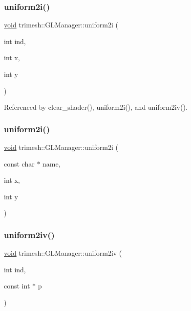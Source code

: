 \subsubsection{\texorpdfstring{uniform2i()}{uniform2i()}\hspace{0.1cm}{\footnotesize\ttfamily [1/2]}}
{\footnotesize\ttfamily \hyperlink{namespacetrimesh_a784ddfd979e1c579bda795a8edfc3f43}{void} trimesh\+::\+G\+L\+Manager\+::uniform2i (\begin{DoxyParamCaption}\item[{int}]{ind,  }\item[{int}]{x,  }\item[{int}]{y }\end{DoxyParamCaption})}



Referenced by clear\+\_\+shader(), uniform2i(), and uniform2iv().

\mbox{\label{classtrimesh_1_1GLManager_a97f27c4bcea42e9ebaef24cf558f91a3}} 
\subsubsection{\texorpdfstring{uniform2i()}{uniform2i()}\hspace{0.1cm}{\footnotesize\ttfamily [2/2]}}
{\footnotesize\ttfamily \hyperlink{namespacetrimesh_a784ddfd979e1c579bda795a8edfc3f43}{void} trimesh\+::\+G\+L\+Manager\+::uniform2i (\begin{DoxyParamCaption}\item[{const char $\ast$}]{name,  }\item[{int}]{x,  }\item[{int}]{y }\end{DoxyParamCaption})\hspace{0.3cm}{\ttfamily [inline]}}

\mbox{\label{classtrimesh_1_1GLManager_aca516770647d91fbb8637878e1ca1a66}} 
\subsubsection{\texorpdfstring{uniform2iv()}{uniform2iv()}\hspace{0.1cm}{\footnotesize\ttfamily [1/2]}}
{\footnotesize\ttfamily \hyperlink{namespacetrimesh_a784ddfd979e1c579bda795a8edfc3f43}{void} trimesh\+::\+G\+L\+Manager\+::uniform2iv (\begin{DoxyParamCaption}\item[{int}]{ind,  }\item[{const int $\ast$}]{p }\end{DoxyParamCaption})\hspace{0.3cm}{\ttfamily [inline]}}



